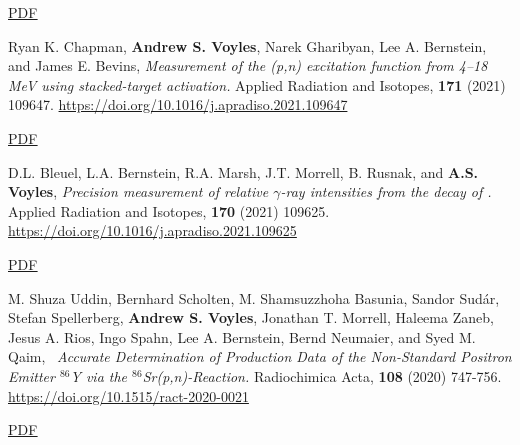 \begin{bibsection}
\ifshort \vspace{0.1cm} \href{https://avoyles.github.io/papers/Fox2021_Nb.pdf}{\underline{PDF}} \else  \fi 


\item Ryan K. Chapman, \textbf{Andrew S. Voyles}, Narek Gharibyan, Lee A. Bernstein, and
James E. Bevins, \emph{Measurement of the (p,n) excitation function from 4--18 MeV using stacked-target activation.} Applied Radiation and Isotopes, \textbf{171} (2021) 109647. \url{https://doi.org/10.1016/j.apradiso.2021.109647} 

\ifshort \vspace{0.1cm} \href{https://avoyles.github.io/papers/Chapman2021_160Tb.pdf}{\underline{PDF}} \else  \fi 


\item D.L. Bleuel, L.A. Bernstein, R.A. Marsh, J.T. Morrell, B. Rusnak, and \textbf{A.S. Voyles},  \emph{Precision measurement of relative $\gamma$-ray intensities from the decay of .} Applied Radiation and Isotopes, \textbf{170} (2021) 109625. \url{https://doi.org/10.1016/j.apradiso.2021.109625} 

\ifshort \vspace{0.1cm} \href{https://avoyles.github.io/papers/Bleuel2021_61Cu.pdf}{\underline{PDF}} \else  \fi 


\item M. Shuza Uddin, Bernhard Scholten, M. Shamsuzzhoha Basunia, Sandor Sudár, Stefan Spellerberg, \textbf{Andrew S. Voyles}, Jonathan T. Morrell, Haleema Zaneb, Jesus A. Rios, Ingo Spahn, Lee A. Bernstein, Bernd Neumaier, and Syed M. Qaim, \ \emph{Accurate Determination of Production Data of the Non-Standard Positron Emitter $^{86}$Y via the $^{86}$Sr(p,n)-Reaction.} Radiochimica Acta, \textbf{108} (2020) 747-756. \url{https://doi.org/10.1515/ract-2020-0021} 

\ifshort \vspace{0.1cm} \href{https://avoyles.github.io/papers/Uddin2020_86Y.pdf}{\underline{PDF}} \else  \fi 


\end{bibsection}
